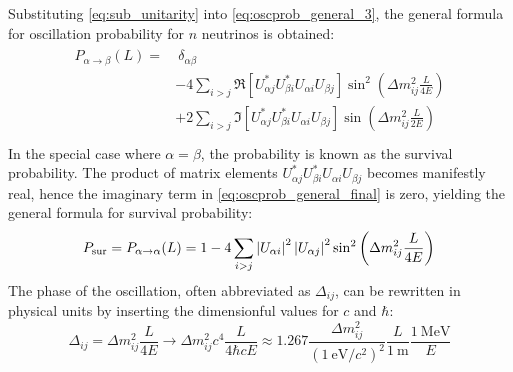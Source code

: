 Substituting \cref{eq:sub_unitarity} into \cref{eq:oscprob_general_3},
the general formula for oscillation probability for $n$ neutrinos is obtained:
\begin{align}\label{eq:oscprob_general_final}
    \begin{split}
        P_{\alpha\to\beta}(L) =
        &\ \delta_{\alpha\beta} \\
        & - 4\sum_{i>j} \Re \left[
            U^*_{\alpha j} U^*_{\beta i} U_{\alpha i} U_{\beta j}
        \right]
        \sin^2\left(\Delta m^2_{ij}\frac{L}{4E}\right) \\
        & + 2\sum_{i>j} \Im \left[
            U^*_{\alpha j} U^*_{\beta i} U_{\alpha i} U_{\beta j}
        \right]
        \sin\left(\Delta m^2_{ij}\frac{L}{2E}\right) \\
    \end{split}
\end{align}
In the special case where $\alpha = \beta$, the probability
is known as the survival probability.
The product of matrix elements
$U^*_{\alpha j} U^*_{\beta i} U_{\alpha i} U_{\beta j}$
becomes manifestly real,
hence the imaginary term in \cref{eq:oscprob_general_final} is zero,
yielding the general formula for survival probability:
\begin{equation}\label{eq:survival_prob_general}
        P_{\text{sur}} = P_{\alpha\to\alpha}(L) =
        1 - 4\sum_{i>j}
        \left|U_{\alpha i}\right|^2
        \left|U_{\alpha j}\right|^2
        \sin^2\left(\Delta m^2_{ij}\frac{L}{4E}\right) \\
\end{equation}
The phase of the oscillation, often abbreviated as $\Delta_{ij}$,
can be rewritten in physical units by
inserting the dimensionful values for $c$ and $\hbar$:
\begin{equation}\label{eq:osc_phase_shorthand}
    \Delta_{ij} = \Delta m^2_{ij}\frac{L}{4E} \to
    \Delta m^2_{ij} c^4 \frac{L}{4\hbar cE}
    \approx 1.267
    \frac{\Delta m^2_{ij}}{(\SI{1}{\eV}/c^2)^2}
    \frac{L}{\SI{1}{\m}}
    \frac{\SI{1}{\MeV}}{E}
\end{equation}

